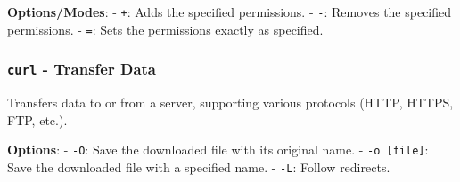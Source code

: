 \documentclass[11pt,a4paper]{article}
\begin{document}
\textbf{Options/Modes}: - \texttt{+}: Adds the specified permissions. -
\texttt{-}: Removes the specified permissions. - \texttt{=}: Sets the
permissions exactly as specified.

\subsubsection{\texorpdfstring{\texttt{curl} - Transfer
Data}{curl - Transfer Data}}\label{curl---transfer-data}

Transfers data to or from a server, supporting various protocols (HTTP,
HTTPS, FTP, etc.).

\begin{Shaded}
\begin{Highlighting}[]
 \PreprocessorTok{[}\PreprocessorTok{]} \PreprocessorTok{[}\PreprocessorTok{]}
\end{Highlighting}
\end{Shaded}

\textbf{Options}: - \texttt{-O}: Save the downloaded file with its
original name. - \texttt{-o\ {[}file{]}}: Save the downloaded file with
a specified name. - \texttt{-L}: Follow redirects.
\end{document}
